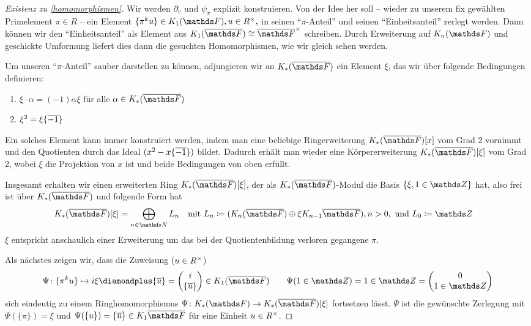 \documentclass[ngerman,fontsize=11pt, paper=a4, parskip=half, titlepage=true, toc=bib]{scrartcl}
\begin{document}
\begin{proof}[Existenz zu \ref{homomorphismen}]
  Wir werden $\partial_v$ und $\psi_\pi$ explizit konstruieren.
  Von der Idee her soll 
  – wieder zu unserem fix gewählten Primelement $\pi\in R$ – 
  ein Element $\{\pi^ku\}\in\KoF, u\in \Rx,$
  in seinen \enquote{$\pi$-Anteil} und seinen 
  \enquote{Einheitsanteil} zerlegt werden. 
  Dann können wir den \enquote{Einheitsanteil} als Element aus 
  $\K_1(\bF)\cong \bFx$ schreiben. Durch Erweiterung auf $\KnF$ und 
  geschickte Umformung liefert dies dann die
  gesuchten Homomorphismen, wie wir gleich sehen werden.
  
  Um unseren \enquote{$\pi$-Anteil} sauber darstellen zu können,
  adjungieren wir an $\KbF$ ein Element $\xi$, das wir über
  folgende Bedingungen definieren:
  \begin{enumerate}[(1)]
  \item $\xi\cdot \alpha=(-1)\alpha\xi$ für alle $\alpha\in\KbF$
  \item $\xi^2=\xi\{\overline{-1}\}$
  \end{enumerate}
  Ein solches Element kann immer konstruiert werden, indem man eine
  beliebige Ringerweiterung $\KbF[x]$ vom Grad 2 vornimmt und den
  Quotienten durch das Ideal $(x^2-x\{\overline{-1}\})$ bildet. Dadurch
  erhält man wieder eine Körpererweiterung $\KbF[\xi]$ vom Grad 2,
  wobei $\xi$ die Projektion von $x$ ist und beide Bedingungen von
  oben erfüllt.
  
  Insgesamt erhalten wir einen erweiterten Ring $\KbF[\xi]$, der als
  $\KbF$-Modul die Basis $\{ \xi, 1\in\Z\}$ hat, also frei ist über
  $\KbF$ und folgende Form hat
  \begin{align*}
    \KbF[\xi]&=\bigoplus_{n\in\N}L_n
    &&\text{mit } 
       L_n\coloneqq (\KnbF\oplus\xi\K_{n-1}\bF), n>0,
       \text{ und }L_0\coloneqq\Z
  \end{align*}
  $\xi$ entspricht anschaulich einer Erweiterung um das bei
  der Quotientenbildung verloren gegangene $\pi$.

  Als nächstes zeigen wir, dass die Zuweisung ($u\in R^\times$)
  \begin{gather*}
    \Psi\colon\{\pi^ku\}\mapsto i\xi \p \{\ov u\}
    =\begin{pmatrix} i\\\{\ov u\} \end{pmatrix}\in\K_1(\bF)
    \qquad \Psi(1\in\Z)=1\in\Z=\begin{pmatrix}0\\1\in\Z\end{pmatrix}
  \end{gather*}
  sich eindeutig zu einem Ringhomomorphismus
  $\Psi\colon\KF\to\KbF[\xi]$ fortsetzen lässt.
  $\Psi$ ist die gewünschte Zerlegung mit $\Psi(\{\pi\})=\xi$ 
  und $\Psi(\{u\})=\{\ov u\}\in\K_1\bF$ für
  eine Einheit $u\in R^\times$.


\end{proof}
\end{document}
